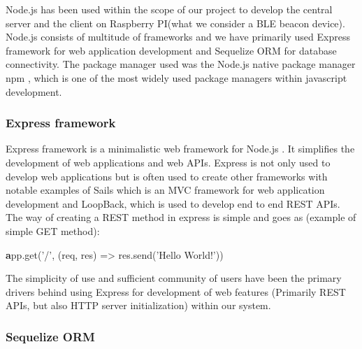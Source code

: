 Node.js has been used within the scope of our project to develop the central server and the client on Raspberry PI(what we consider a BLE beacon device). Node.js consists of multitude of frameworks and we have primarily used Express framework for web application development and Sequelize ORM for database connectivity. The package manager used was the Node.js native package manager npm \citep{npm}, which is one of the most widely used package managers within javascript development.

\subsubsection{Express framework}
\label{subsubsec:express}

Express framework is a minimalistic web framework for Node.js \citep{express}. It simplifies the development of web applications and web APIs. Express is not only used to develop web applications but is often used to create other frameworks with notable examples of Sails which is an MVC framework for web application development and LoopBack, which is used to develop end to end REST APIs. The way of creating a REST method in express is simple and goes as (example of simple GET method):\newline 

\smallskip
{\textbf app.get('/', (req, res) => res.send('Hello World!'))}
\newline
\smallskip

The simplicity of use and sufficient community of users have been the primary drivers behind using Express for development of web features (Primarily REST APIs, but also HTTP server initialization) within our system.

\subsubsection{Sequelize ORM}
\label{subsubsec:sequelize}

